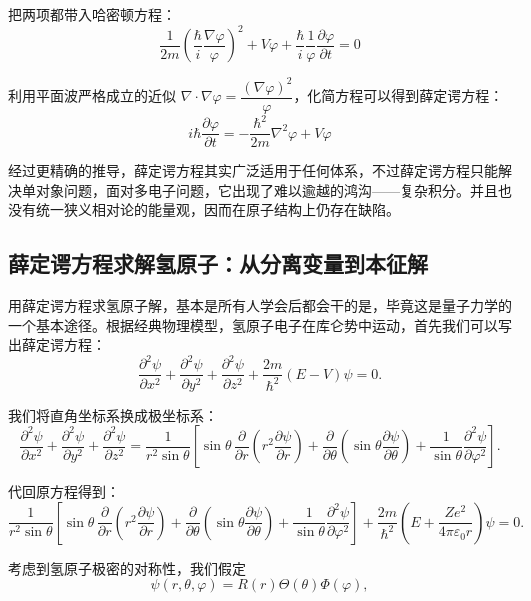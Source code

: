 \documentclass[UTF8]{ctexbook}
\begin{document}
把两项都带入哈密顿方程：
\[
\dfrac{1}{2m}\left(\dfrac{\hbar}{i}\dfrac{\nabla\varphi}{\varphi}\right)^2+V\varphi+\dfrac{\hbar}{i}\dfrac{1}{\varphi}\dfrac{\partial\varphi}{\partial t}=0
\]

利用平面波严格成立的近似 \(\nabla\cdot\nabla\varphi=\dfrac{(\nabla\varphi)^2}{\varphi}\)，化简方程可以得到薛定谔方程：
\[
\boxed{ i\hbar\dfrac{\partial\varphi}{\partial t}=-\dfrac{\hbar^2}{2m}\nabla^2\varphi+V\varphi }
\]

经过更精确的推导，薛定谔方程其实广泛适用于任何体系，不过薛定谔方程只能解决单对象问题，面对多电子问题，它出现了难以逾越的鸿沟——复杂积分。并且也没有统一狭义相对论的能量观，因而在原子结构上仍存在缺陷。

\subsection{薛定谔方程求解氢原子：从分离变量到本征解}

用薛定谔方程求氢原子解，基本是所有人学会后都会干的是，毕竟这是量子力学的一个基本途径。根据经典物理模型，氢原子电子在库仑势中运动，首先我们可以写出薛定谔方程：
\[
\frac{\partial^2\psi}{\partial x^2}+\frac{\partial^2\psi}{\partial y^2}+\frac{\partial^2\psi}{\partial z^2}
+\frac{2m}{\hbar^2}(E-V)\psi=0.
\]

我们将直角坐标系换成极坐标系：
\[
\frac{\partial^2\psi}{\partial x^2}+\frac{\partial^2\psi}{\partial y^2}+\frac{\partial^2\psi}{\partial z^2}
=\frac{1}{r^2\sin\theta}\left[\sin\theta\,\frac{\partial}{\partial r}\left(r^2\frac{\partial\psi}{\partial r}\right)
+\frac{\partial}{\partial\theta}\left(\sin\theta\frac{\partial\psi}{\partial\theta}\right)
+\frac{1}{\sin\theta}\frac{\partial^2\psi}{\partial\varphi^2}\right].
\]

代回原方程得到：
\[
\frac{1}{r^2\sin\theta}\left[\sin\theta\,\frac{\partial}{\partial r}\left(r^2\frac{\partial\psi}{\partial r}\right)
+\frac{\partial}{\partial\theta}\left(\sin\theta\frac{\partial\psi}{\partial\theta}\right)
+\frac{1}{\sin\theta}\frac{\partial^2\psi}{\partial\varphi^2}\right]
+\frac{2m}{\hbar^2}\left(E+\frac{Ze^2}{4\pi\varepsilon_0 r}\right)\psi=0.
\]

考虑到氢原子极密的对称性，我们假定
\[
\psi(r,\theta,\varphi)=R(r)\Theta(\theta)\Phi(\varphi),
\]
\end{document}
